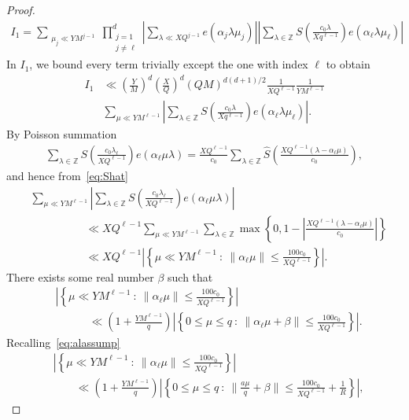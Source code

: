 \documentclass[10pt,a4paper]{amsart}
\def\Z{{\mathbb Z}}
\def\le{\leqslant}
\begin{document}
\begin{proof}
\begin{align*}
I_1=\sum_{\substack{\mu_j \ll YM^{j-1}}}\prod_{\substack{j=1 \\ j\neq \ell }}^{d}\left|\sum_{\lambda \ll XQ^{j-1}}e(\alpha_j \lambda \mu_j)\right|\left|\sum_{\lambda \in \Z}S\left(\frac{c_0\lambda}{Xq^{\ell-1}}\right)e(\alpha_\ell \lambda \mu_\ell)\right|
\end{align*}
In $I_1$, we bound every term trivially except the one with index $\ell$ to obtain 
\begin{align}
\label{eq:I1I1}
I_1&\ll \left(\frac{Y}{M}\right)^{d}\left(\frac{X}{Q}\right)^{d}(QM)^{d(d+1)/2}\frac{1}{XQ^{\ell-1}}\frac{1}{YM^{\ell-1}} \\ &\sum_{\mu\ll YM^{\ell-1}}\left|\sum_{\lambda \in \Z}S\left(\frac{c_0\lambda}{Xq^{\ell-1}}\right)e(\alpha_\ell \lambda \mu_\ell)\right|.
\end{align}
By Poisson summation
\begin{align*}
\sum_{\lambda \in \Z}S\left(\frac{c_0\lambda_{\ell}}{XQ^{\ell-1}}\right)e(\alpha_\ell\mu \lambda)=\frac{XQ^{\ell-1}}{c_0}\sum_{\lambda \in \Z}\widehat S\left(\frac{XQ^{\ell-1}(\lambda-\alpha_{\ell}\mu)}{c_0}\right),
\end{align*}
and hence from~\eqref{eq:Shat}
\begin{align*}
&\sum_{\mu\ll YM^{\ell-1}}\left|\sum_{\lambda \in \Z}S\left(\frac{c_0\lambda_{\ell}}{XQ^{\ell-1}}\right)e(\alpha_\ell\mu \lambda)\right| \\ &  \quad \quad \quad \quad \quad \ll XQ^{\ell-1}\sum_{\mu\ll YM^{\ell-1}}\sum_{\lambda \in \Z}\max\left\{0,1-\left|\frac{XQ^{\ell-1}(\lambda-\alpha_{\ell}\mu)}{c_0} \right| \right\} \\ & 
\quad \quad \quad \quad \quad \ll XQ^{\ell-1}\left|\left\{ \mu \ll YM^{\ell-1} \ : \ \|\alpha_{\ell}\mu\|\le \frac{100c_0}{XQ^{\ell-1}} \right\}\right|.
\end{align*}
There exists some real number $\beta$ such that 
\begin{align*}
&\left|\left\{ \mu \ll YM^{\ell-1} \ : \ \|\alpha_{\ell}\mu\|\le \frac{100c_0}{XQ^{\ell-1}} \right\}\right| \\ & \quad \quad \quad \ll \left(1+\frac{YM^{\ell-1}}{q}\right)\left|\left\{ 0\le \mu \le q \ : \ \|\alpha_{\ell}\mu+\beta\|\le \frac{100c_0}{XQ^{\ell-1}} \right\}\right|.
\end{align*}
Recalling~\eqref{eq:alassump}
\begin{align*}
&\left|\left\{ \mu \ll YM^{\ell-1} \ : \ \|\alpha_{\ell}\mu\|\le \frac{100c_0}{XQ^{\ell-1}} \right\}\right| \\ &  \quad \quad \ll \left(1+\frac{YM^{\ell-1}}{q}\right)\left|\left\{ 0\le \mu \le q \ : \ \|\frac{a\mu}{q}+\beta\|\le \frac{100c_0}{XQ^{\ell-1}}+\frac{1}{R} \right\}\right|,

\end{align*}
\end{proof}
\end{document}
